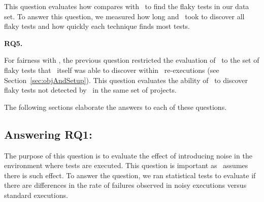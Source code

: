 \documentclass[conference]{IEEEtran}
\begin{document}
This question evaluates how \tname{} compares with \rerun\ to find the flaky tests in our data set. To answer this question, we measured how long \tname{} and \rerun\ took to discover all flaky tests and how quickly each technique finds most tests. 

\vspace{0.5ex}
\noindent\textbf{RQ5.} \rqfive
\vspace{0.5ex}

For fairness with \rerun, the previous question restricted the evaluation of \tname\ to the set of flaky tests that \rerun\ itself was able to discover within \numReRuns\ re-executions (see Section~\ref{sec:objAndSetup}). This question evaluates the ability of \tname\ to discover flaky tests not detected by \rerun\ in the same set of projects.

\vspace{0.5ex}
The following sections elaborate the answers to each of these questions.


\subsection{Answering RQ1: \rqone}
\label{sec:answer-rqone}


The purpose of this question is to evaluate the effect of introducing noise in the environment where tests are executed. This question is important as \tname\ assumes there is such effect. To answer the question, we ran statistical tests to evaluate if there are differences in the rate of failures observed in noisy executions versus standard executions. 
\end{document}

